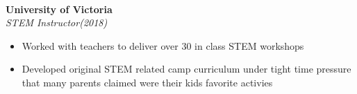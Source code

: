 \documentclass{article}
\newcommand{\grayhline}{
  \noindent\makebox[\linewidth]{\textcolor{gray}{\rule{0.95\textwidth}{1pt}}}\\
}
\newcommand{\minicolumns}[2]{
  \begin{minipage}[t]{0.25\textwidth}
    \begin{flushright}
      #1
    \end{flushright}
  \end{minipage}
  \hfill
  \begin{minipage}[t]{0.7\textwidth}
    #2
  \end{minipage}
}
\newcommand{\resumeSection}[3]{
  \minicolumns{
      \textbf{#1}\\
      \textit{#2}
    }
    {
      \begin{itemize}[leftmargin=*]
          \justifying
          \setlength\itemsep{-0.1em}
          #3
      \end{itemize}
  }
  \vspace{0.5\baselineskip}
}
\begin{document}
\grayhline
\vspace{0.5\baselineskip}
\resumeSection{University of Victoria}{STEM Instructor(2018)}{
  \item Worked with teachers to deliver over 30 in class STEM workshops
  \item Developed original STEM related camp curriculum under tight time pressure
  that many parents claimed were their kids favorite activies
}
\end{document}
